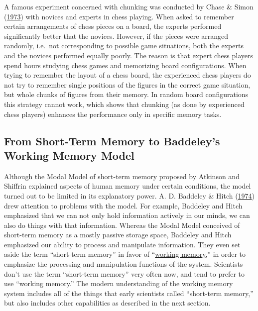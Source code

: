 \documentclass[
]{krantz}
\begin{document}
A famous experiment concerned with chunking was conducted by Chase \& Simon (\protect\hyperlink{ref-Chase1973}{1973}) with novices and experts in chess playing. When asked to remember certain arrangements of chess pieces on a board, the experts performed significantly better that the novices. However, if the pieces were arranged randomly, i.e.~not corresponding to possible game situations, both the experts and the novices performed equally poorly. The reason is that expert chess players spend hours studying chess games and memorizing board configurations. When trying to remember the layout of a chess board, the experienced chess players do not try to remember single positions of the figures in the correct game situation, but whole chunks of figures from their memory. In random board configurations this strategy cannot work, which shows that chunking (as done by experienced chess players) enhances the performance only in specific memory tasks.

\hypertarget{from-short-term-memory-to-baddeleys-working-memory-model}{%
\subsection*{From Short-Term Memory to Baddeley's Working Memory Model}\label{from-short-term-memory-to-baddeleys-working-memory-model}}


Although the Modal Model of short-term memory proposed by Atkinson and Shiffrin explained aspects of human memory under certain conditions, the model turned out to be limited in its explanatory power. A. D. Baddeley \& Hitch (\protect\hyperlink{ref-baddeley1974working}{1974}) drew attention to problems with the model. For example, Baddeley and Hitch emphasized that we can not only hold information actively in our minds, we can also do things with that information. Whereas the Modal Model conceived of short-term memory as a mostly passive storage space, Baddeley and Hitch emphasized our ability to process and manipulate information. They even set aside the term ``short-term memory'' in favor of ``\protect\hyperlink{working-memory}{working memory},'' in order to emphasize the processing and manipulation functions of the system. Scientists don't use the term ``short-term memory'' very often now, and tend to prefer to use ``working memory.'' The modern understanding of the working memory system includes all of the things that early scientists called ``short-term memory,'' but also includes other capabilities as described in the next section.
\end{document}
